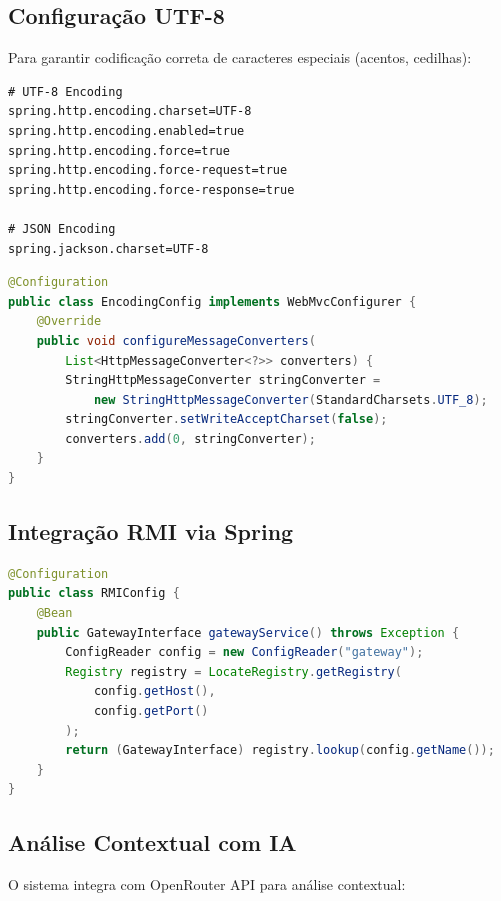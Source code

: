 \documentclass[12pt,a4paper]{article}
\begin{document}
\subsection{Configuração UTF-8}

Para garantir codificação correta de caracteres especiais (acentos, cedilhas):

\begin{lstlisting}[caption={application.properties}]
# UTF-8 Encoding
spring.http.encoding.charset=UTF-8
spring.http.encoding.enabled=true
spring.http.encoding.force=true
spring.http.encoding.force-request=true
spring.http.encoding.force-response=true

# JSON Encoding
spring.jackson.charset=UTF-8
\end{lstlisting}

\begin{lstlisting}[language=Java, caption={EncodingConfig.java}]
@Configuration
public class EncodingConfig implements WebMvcConfigurer {
    @Override
    public void configureMessageConverters(
        List<HttpMessageConverter<?>> converters) {
        StringHttpMessageConverter stringConverter = 
            new StringHttpMessageConverter(StandardCharsets.UTF_8);
        stringConverter.setWriteAcceptCharset(false);
        converters.add(0, stringConverter);
    }
}
\end{lstlisting}

\subsection{Integração RMI via Spring}

\begin{lstlisting}[language=Java, caption={RMIConfig.java - Bean de Gateway}]
@Configuration
public class RMIConfig {
    @Bean
    public GatewayInterface gatewayService() throws Exception {
        ConfigReader config = new ConfigReader("gateway");
        Registry registry = LocateRegistry.getRegistry(
            config.getHost(), 
            config.getPort()
        );
        return (GatewayInterface) registry.lookup(config.getName());
    }
}
\end{lstlisting}

\subsection{Análise Contextual com IA}

O sistema integra com OpenRouter API para análise contextual:
\end{document}
